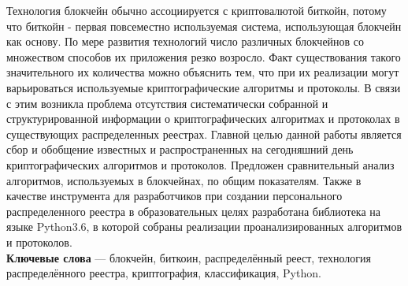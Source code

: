 Технология блокчейн обычно ассоциируется с криптовалютой биткойн, потому что
биткойн - первая повсеместно используемая система, использующая блокчейн как
основу. По мере развития технологий число различных блокчейнов со множеством
способов их приложения резко возросло. Факт существования такого значительного
их количества можно объяснить тем, что при их реализации могут варьироваться
используемые криптографические алгоритмы и протоколы. В связи с этим возникла
проблема отсутствия систематически собранной и структурированной информации о
криптографических алгоритмах и протоколах в существующих распределенных
реестрах. Главной целью данной работы является сбор и обобщение известных и
распространенных на сегодняшний день криптографических алгоритмов и протоколов.
Предложен сравнительный анализ алгоритмов, используемых в блокчейнах, по общим
показателям. Также в качестве инструмента для разработчиков при создании
персонального распределенного реестра в образовательных целях разработана
библиотека на языке Python3.6, в которой собраны реализации проанализированных
алгоритмов и протоколов.\\

\textbf{Ключевые слова} --- блокчейн, биткоин, распределённый реест,
технология распределённого реестра, криптография, классификация, Python.
